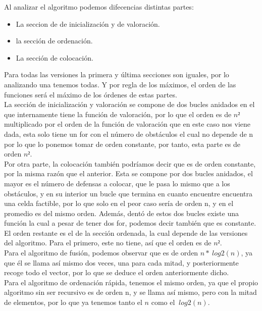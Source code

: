 Al analizar el algoritmo podemos difecencias distintas partes:
\begin{itemize}
    \item La seccion de de inicialización y de valoración.
    \item la sección de ordenación.
    \item La sección de colocación.
\end{itemize}

Para todas las versiones la primera y última secciones son iguales, por lo analizando una tenemos todas. Y por regla de los máximos, el orden de las funciones será el máximo de los órdenes de estas partes. \\

La sección de inicialización y valoración se compone de dos bucles anidados en el que internamente tiene la función de valoración, por lo que el orden es de $n²$ multiplicado por el orden de la función de valoración que en este caso nos viene dada, esta solo tiene un for con el número de obstáculos el cual no depende de n por lo que lo ponemos tomar de orden constante, por tanto, esta parte es de orden $n²$.\\

Por otra parte, la colocación también podríamos decir que es de orden constante, por la misma razón que el anterior. Esta se compone por dos bucles anidados, el mayor es el número de defensas a colocar, que le pasa lo mismo que a los obstáculos, y en su interior un bucle que termina en cuanto encuentre encuentra una celda factible, por lo que solo en el peor caso sería de orden n, y en el promedio es del mismo orden. Además, dentó de estos dos bucles existe una función la cual a pesar de tener dos for, podemos decir también que es constante. \\

El orden restante es el de la sección ordenada, la cual depende de las versiones del algoritmo. Para el primero, este no tiene, así que el orden es de $n²$.\\

Para el algoritmo de fusión, podemos observar que es de orden $n * \ log{2} (n)$, ya que él se llama así mismo dos veces, una para cada mitad, y posteriormente recoge todo el vector, por lo que se deduce el orden anteriormente dicho.\\

Para el algoritmo de ordenación rápida, tenemos el mismo orden, ya que el propio algoritmo sin ser recursivo es de orden n, y se llama así mismo, pero con la mitad de elementos, por lo que ya tenemos tanto el $n$ como el $\ log{2} (n)$.\\

